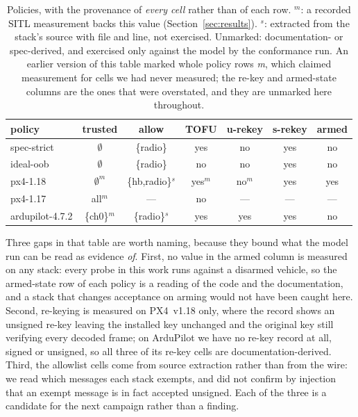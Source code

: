 \documentclass[conference]{IEEEtran}
\begin{document}
\begin{table}[t]
\caption{Policies, with the provenance of \emph{every cell} rather than of
each row. $^{m}$: a recorded SITL measurement backs this value
(Section~\ref{sec:results}). $^{s}$: extracted from the stack's source with
file and line, not exercised. Unmarked: documentation- or spec-derived, and
exercised only against the model by the conformance run. An earlier version of
this table marked whole policy rows \emph{m}, which claimed measurement for
cells we had never measured; the re-key and armed-state columns are the ones
that were overstated, and they are unmarked here throughout.}
\label{tab:policies}
\centering\footnotesize
\setlength{\tabcolsep}{3pt}
\begin{tabular}{@{}lcccccc@{}}
\toprule
policy & trusted & allow & TOFU & u-rekey & s-rekey & armed \\
\midrule
\textsf{spec-strict}     & $\emptyset$ & \{radio\}   & yes & no  & yes & no  \\
\textsf{ideal-oob}       & $\emptyset$ & \{radio\}   & no  & no  & yes & no  \\
\textsf{px4-1.18}  & $\emptyset^{m}$ & \{hb,radio\}$^{s}$ & yes$^{m}$ & no$^{m}$ & yes & yes \\
\textsf{px4-1.17}  & all$^{m}$       & ---                & no        & ---       & --- & --- \\
\textsf{ardupilot-4.7.2} & \{ch0\}$^{m}$ & \{radio\}$^{s}$ & yes & yes & yes & no \\
\bottomrule
\end{tabular}
\end{table}

Three gaps in that table are worth naming, because they bound what the model
run can be read as evidence \emph{of}. First, no value in the armed column is
measured on any stack: every probe in this work runs against a disarmed
vehicle, so the armed-state row of each policy is a reading of the code and the
documentation, and a stack that changes acceptance on arming would not have
been caught here. Second, re-keying is measured on PX4~v1.18 only, where the
record shows an unsigned re-key leaving the installed key unchanged and the
original key still verifying every decoded frame; on ArduPilot we have no
re-key record at all, signed or unsigned, so all three of its re-key cells are
documentation-derived. Third, the allowlist cells come from source extraction
rather than from the wire: we read which messages each stack exempts, and did
not confirm by injection that an exempt message is in fact accepted unsigned.
Each of the three is a candidate for the next campaign rather than a finding.
\end{document}
